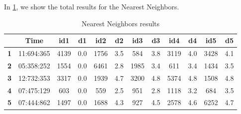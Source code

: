 \documentclass[12pt]{article}
\begin{document}
	In \ref{nnresults}, we show the total results for the Nearest Neighbors.
	
	\begin{table}[H]
		\centering
		\begin{tabular}{|c|c|c|c|c|c|c|c|c|c|c|c|}
			\hline
			\textbf{}  & \textbf{Time} & \textbf{id1} & \textbf{d1} & \textbf{id2} & \textbf{d2} & \textbf{id3} & \textbf{d3} & \textbf{id4} & \textbf{d4} & \textbf{id5} & \textbf{d5} \\ \hline
			\textbf{1} & 11:694:365    & 4139          & 0.0           & 1756         & 3.5           & 584         & 3.8           & 3119          & 4.0           & 3428         & 4.1           \\ \hline
			\textbf{2} & 05:358:252     & 1554          & 0.0           & 6461          & 2.8          & 1985          & 3.4          & 611         & 3.4         & 1434         & 3.5         \\ \hline
			\textbf{3} & 12:732:353    & 3317         & 0.0           & 1939          & 4.7           & 3200          & 4.8           & 5374          & 4.8           & 1508          & 4.8          \\ \hline
			\textbf{4} & 07:475:129     & 603         & 0.0           & 559          & 2.5           & 951         & 2.8           & 1118          & 3.2          & 684          & 3.5          \\ \hline
			\textbf{5} & 07:444:862     & 1497          & 0.0           & 1688         & 4.3          & 927         & 4.5          & 2578         & 4.6          & 6252         & 4.7         \\ \hline
		\end{tabular}
	\caption{Nearest Neighbors results}
	\label{nnresults}
	\end{table}
	
\end{document}
